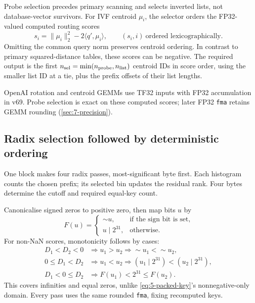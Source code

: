 Probe selection precedes primary scanning and selects inverted lists,
not database-vector survivors. For IVF centroid $\mu_i$, the selector
orders the FP32-valued computed routing scores
\begin{equation}
 s_i=\|\mu_i\|_2^2-2\langle q',\mu_i\rangle,
 \qquad (s_i,i)\ \text{ordered lexicographically}.
 \label{eq:5-probe-score}
\end{equation}
Omitting the common query norm preserves centroid ordering. In contrast
to primary squared-distance tables, these scores can be negative. The
required output is the first $n_{\rm sel}=\min(n_{\rm probe},n_{\rm list})$
centroid IDs in score order, using the smaller list ID at a tie, plus
the prefix offsets of their list lengths.

OpenAI rotation and centroid GEMMs use TF32 inputs with FP32 accumulation in v69. Probe selection is exact on these computed scores; later FP32 \texttt{fma} retains GEMM rounding (\cref{sec:7-precision}).

\subsection{Radix selection followed by deterministic ordering}

One block makes four radix passes, most-significant byte first. Each histogram counts the chosen prefix; its selected bin updates the residual rank. Four bytes determine the cutoff and required equal-key count.

Canonicalise signed zeros to positive zero, then map bits $u$ by
\begin{equation}
 F(u)=\begin{cases}
       \mathop{\sim}u,&\text{if the sign bit is set},\\
       u\mathbin{|}2^{31},&\text{otherwise}.
      \end{cases}
 \label{eq:5-probe-key}
\end{equation}
For non-NaN scores, monotonicity follows by cases:
\[
 \begin{aligned}
 D_1<D_2<0&\Rightarrow u_1>u_2\Rightarrow{\sim}u_1<{\sim}u_2,\\
 0\leq D_1<D_2&\Rightarrow u_1<u_2\Rightarrow
 (u_1\mathbin{|}2^{31})<(u_2\mathbin{|}2^{31}),\\
 D_1<0\leq D_2&\Rightarrow F(u_1)<2^{31}\leq F(u_2).
 \end{aligned}
\]
This covers infinities and equal zeros, unlike \cref{eq:5-packed-key}'s nonnegative-only domain. Every pass uses the same rounded \texttt{fma}, fixing recomputed keys.

